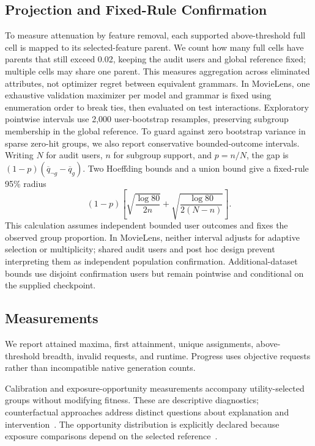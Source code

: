\documentclass[sigconf,nonacm]{acmart}
\begin{document}
\subsection{Projection and Fixed-Rule Confirmation}
To measure attenuation by feature removal, each supported above-threshold full cell is mapped to its selected-feature parent. We count how many full cells have parents that still exceed 0.02, keeping the audit users and global reference fixed; multiple cells may share one parent. This measures aggregation across eliminated attributes, not optimizer regret between equivalent grammars. In MovieLens, one exhaustive validation maximizer per model and grammar is fixed using enumeration order to break ties, then evaluated on test interactions. Exploratory pointwise intervals use 2,000 user-bootstrap resamples, preserving subgroup membership in the global reference. To guard against zero bootstrap variance in sparse zero-hit groups, we also report conservative bounded-outcome intervals. Writing $N$ for audit users, $n$ for subgroup support, and $p=n/N$, the gap is $(1-p)(\overline q_{\neg g}-\overline q_g)$. Two Hoeffding bounds and a union bound give a fixed-rule 95\% radius
\begin{equation}
(1-p)\left[\sqrt{\frac{\log 80}{2n}}+\sqrt{\frac{\log 80}{2(N-n)}}\right].
\end{equation}
This calculation assumes independent bounded user outcomes and fixes the observed group proportion. In MovieLens, neither interval adjusts for adaptive selection or multiplicity; shared audit users and post hoc design prevent interpreting them as independent population confirmation. Additional-dataset bounds use disjoint confirmation users but remain pointwise and conditional on the supplied checkpoint.

\subsection{Measurements}
We report attained maxima, first attainment, unique assignments, above-threshold breadth, invalid requests, and runtime. Progress uses objective requests rather than incompatible native generation counts.

Calibration and exposure-opportunity measurements accompany utility-selected groups without modifying fitness. These are descriptive diagnostics; counterfactual approaches address distinct questions about explanation and intervention~\cite{li2021towards,medda2024gnnuers}. The opportunity distribution is explicitly declared because exposure comparisons depend on the selected reference~\cite{singh2018fairness}.
\end{document}
